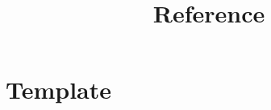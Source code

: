 \documentclass[10pt,a4paper,addpoints]{exam}
\title{Reference}
\begin{document}
\section{Template}

\end{document}
